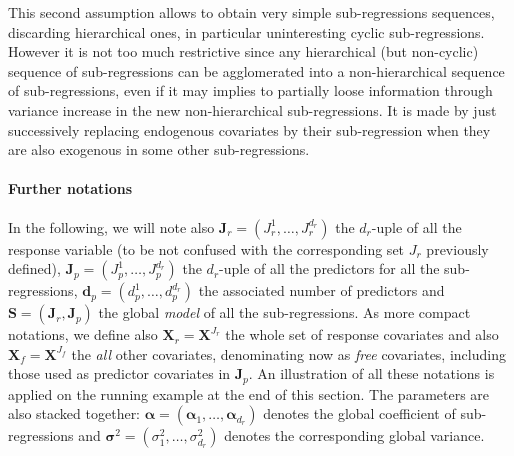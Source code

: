 \documentclass[12pt,a4paper]{report}
\begin{document}
 This second assumption allows to obtain very simple sub-regressions sequences, discarding hierarchical ones, in particular uninteresting cyclic sub-regressions. However it is not too much restrictive since any hierarchical (but non-cyclic) sequence of sub-regressions can be agglomerated into a non-hierarchical sequence of sub-regressions, even if it may implies to partially loose information through variance increase in the new non-hierarchical sub-regressions. It is made by just successively replacing endogenous covariates by their sub-regression when they are also exogenous in some other sub-regressions. 

\paragraph{Further notations} In the following, we will note also $\boldsymbol{J}_r=(J_{r}^1,\ldots,J_r^{d_r})$ the $d_r$-uple of all the response variable (to be not confused with the corresponding set $J_r$ previously defined), $\boldsymbol{J}_p=(J_{p}^1,\ldots,J_p^{d_r})$ the $d_r$-uple of all the predictors for all the sub-regressions, $\boldsymbol{d}_p=(d_p^1,\ldots,d_p^{d_{r}})$ the associated number of predictors and $\boldsymbol{S}=(\boldsymbol{J}_r,\boldsymbol{J}_p)$ the global {\it model} of all the sub-regressions. As more compact notations, we define also $\boldsymbol{X}_r=\boldsymbol{X}^{J_{r}}$ the whole set of response covariates and also $\boldsymbol{X}_f=\boldsymbol{X}^{J_{f}}$ the {\it all} other covariates, denominating now as {\it free} covariates, including those used as predictor covariates in $\boldsymbol{J}_p$. An illustration of all these notations is applied on the running example at the end of this section. The parameters are also stacked together: $\boldsymbol{\alpha}=(\boldsymbol{\alpha}_1,\ldots,\boldsymbol{\alpha}_{d_r})$ denotes the global coefficient of sub-regressions and $\boldsymbol{\sigma}^2=(\sigma^2_1,\ldots,\sigma^2_{d_r})$ denotes the corresponding global variance.
\end{document}
